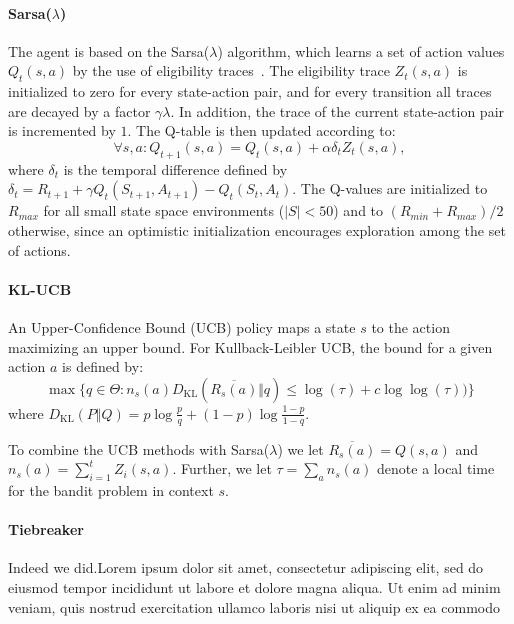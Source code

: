 
\paragraph{Sarsa($\lambda$)}
The agent is based on the Sarsa($\lambda$) algorithm, which learns a set of
action values $Q_t(s,a)$ by the use of eligibility
traces~\cite{Sutton:1998:IRL:551283}. The eligibility trace $Z_t(s,a)$ is
initialized to zero for every state-action pair, and for every transition all
traces are decayed by a factor $\gamma\lambda$. In addition, the trace of the
current state-action pair is incremented by $1$. The Q-table is then updated
according to:
\begin{equation}
        \forall s,a : Q_{t+1}(s,a) = Q_t(s,a) + \alpha\delta_t Z_t(s,a),
\end{equation}
where $\delta_t$ is the temporal difference defined by $\delta_t = R_{t+1} +
\gamma Q_t(S_{t+1},A_{t+1}) - Q_t(S_t,A_t)$. The Q-values are initialized to
$R_{max}$ for all small state space environments ($\vert{S}\vert < 50$) and to
$(R_{min}+R_{max})/2$ otherwise, since an optimistic initialization encourages
exploration among the set of actions.

\paragraph{KL-UCB}
An Upper-Confidence Bound (UCB) policy maps a state $s$ to the action maximizing
an upper bound. For Kullback-Leibler UCB, the bound for a given action $a$ is
defined by:
\begin{equation}
    \max\big\{q \in \Theta : n_s(a)
        D_{\mathrm{KL}}\left(\overline{R_s(a)}\Big\Vert{q}\right) \le \log(\tau) +
        c\log\log(\tau))\big\}
\end{equation}
where $D_\mathrm{KL}(P\Vert{Q}) = p \log
\frac{p}{q}+(1-p)\log\frac{1-p}{1-q}$.~\cite{DBLP:journals/jmlr/GarivierC11}

To combine the UCB methods with Sarsa($\lambda$) we let
$\overline{R_s(a)}=Q(s,a)$ and $n_s(a) = \sum_{i=1}^tZ_i(s,a)$. Further, we let
$\tau = \sum_a{n_s(a)}$ denote a local time for the bandit problem in context
$s$.


\paragraph{Tiebreaker}
Indeed we did.Lorem ipsum dolor sit amet, consectetur adipiscing elit, sed do
eiusmod tempor incididunt ut labore et dolore magna aliqua. Ut enim ad minim
veniam, quis nostrud exercitation ullamco laboris nisi ut aliquip ex ea commodo


